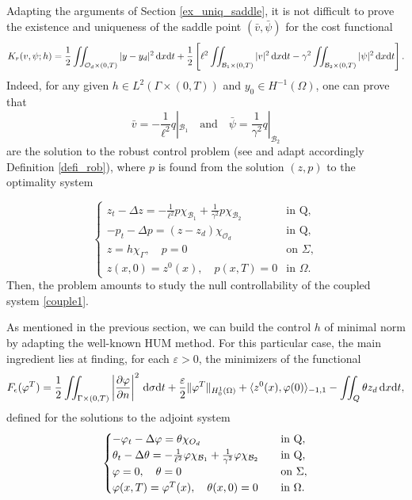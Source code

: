 \documentclass{aims}
\theoremstyle{definition}
\def\cbd{\Gamma}
\newcommand\csin[1]{\chi_{#1}}
\def\dx{\,\textnormal{d}x}
\def\dt{\textnormal{d}t}
\def\d{\,\textnormal{d}}
\begin{document}
Adapting the arguments of Section \ref{ex_uniq_saddle}, it is not difficult to prove the existence and uniqueness of the saddle point $(\bar v,\bar \psi)$ for the cost functional 
%
\begin{equation*}%
K_r(v,\psi;h)=\frac{1}{2}\iint_{\mathcal O_d\times(0,T)}|y-y_d|^2\dx\dt+\frac{1}{2}\left[\ell^2\iint_{\mathcal B_1\times(0,T)}|v|^2\dx\dt-\gamma^2\iint_{\mathcal B_2\times(0,T)}|\psi|^2\dx\dt\right].
\end{equation*}
%
Indeed, for any given $h\in L^2(\cbd\times(0,T))$ and $y_0\in H^{-1}(\Omega)$, one can prove that
%
\begin{equation*}
\bar v=-\frac{1}{\ell^2}q|_{\mathcal B_1} \quad\text{and}\quad \bar \psi=\frac{1}{\gamma^2}q|_{\mathcal B_2}
\end{equation*}
%
are the solution to the robust control problem (see and adapt accordingly Definition \ref{defi_rob}), where $p$ is found from the solution $(z,p)$ to the optimality system 

\begin{equation}\label{couple1}
\begin{cases}
z_t-\Delta z=-\frac{1}{\ell^2}p\csin{\mathcal B_1}+\frac{1}{\gamma^2}p\csin{\mathcal B_2} & \text{in Q}, \\
-p_t-\Delta p=(z-z_d)\chi_{\mathcal O_d} & \text{in Q}, \\
z=h\csin{\Gamma}, \quad p=0 &\text{on } \Sigma, \\
z(x,0)=z^0(x), \quad p(x,T)=0& \text{in } \Omega.
\end{cases}
\end{equation}
%
Then, the problem amounts to study the null controllability of the coupled system \eqref{couple1}. 

As mentioned in the previous section, we can build the control $h$ of minimal norm by adapting the well-known HUM method. For this particular case, the main ingredient lies at finding, for each $\varepsilon>0$, the minimizers of the functional
%
\begin{equation}\label{func_FR}
F_{\epsilon}(\varphi^T)=\frac{1}{2}\iint_{\cbd\times(0,T)}\left|\frac{\partial \varphi}{\partial n}\right|^2\d\sigma\dt+\frac{\varepsilon}{2}\|\varphi^T\|_{H_0^1(\Omega)}+\langle z^0(x),\varphi(0)\rangle_{-1,1}-\iint_{Q}\theta z_d \dx\dt,
\end{equation}
%
defined for the solutions to the adjoint system
%
\begin{equation}\label{adjunto1}
\begin{cases}
-\varphi_t-\Delta \varphi=\theta\csin{\mathcal \mathcal O_d} &\quad \text{in Q}, \\
\theta_t-\Delta \theta=-\frac{1}{\ell^2}\varphi\csin{\mathcal B_1}+\frac{1}{\gamma^2}\varphi \csin{\mathcal B_2} & \quad \text{in Q}, \\
\varphi=0, \quad \theta=0 &\quad \text{on } \Sigma, \\
\varphi(x,T)=\varphi^T(x), \quad \theta(x,0)=0&\quad \text{in } \Omega.
\end{cases}
\end{equation}
\end{document}
